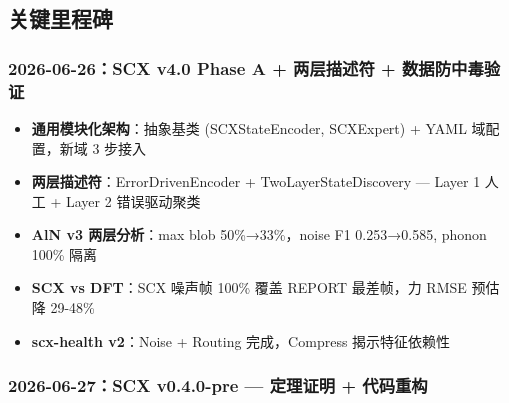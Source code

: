 \documentclass[
  12pt,
]{ctexart}
\providecommand{\tightlist}{%
  \setlength{\itemsep}{0pt}\setlength{\parskip}{0pt}}
\begin{document}
\subsection{关键里程碑}\label{ux5173ux952eux91ccux7a0bux7891}

\subsubsection{2026-06-26：SCX v4.0 Phase A + 两层描述符 +
数据防中毒验证}\label{scx-v4.0-phase-a-ux4e24ux5c42ux63cfux8ff0ux7b26-ux6570ux636eux9632ux4e2dux6bd2ux9a8cux8bc1}

\begin{itemize}
\tightlist
\item
  \textbf{通用模块化架构}：抽象基类 (SCXStateEncoder, SCXExpert) + YAML
  域配置，新域 3 步接入
\item
  \textbf{两层描述符}：ErrorDrivenEncoder + TwoLayerStateDiscovery ---
  Layer 1 人工 + Layer 2 错误驱动聚类
\item
  \textbf{AlN v3 两层分析}：max blob 50\%→33\%，noise F1 0.253→0.585,
  phonon 100\% 隔离
\item
  \textbf{SCX vs DFT}：SCX 噪声帧 100\% 覆盖 REPORT 最差帧，力 RMSE
  预估降 29-48\%
\item
  \textbf{scx-health v2}：Noise + Routing 完成，Compress 揭示特征依赖性
\end{itemize}

\subsubsection{2026-06-27：SCX v0.4.0-pre --- 定理证明 +
代码重构}\label{scx-v0.4.0-pre-ux5b9aux7406ux8bc1ux660e-ux4ee3ux7801ux91cdux6784}
\end{document}
